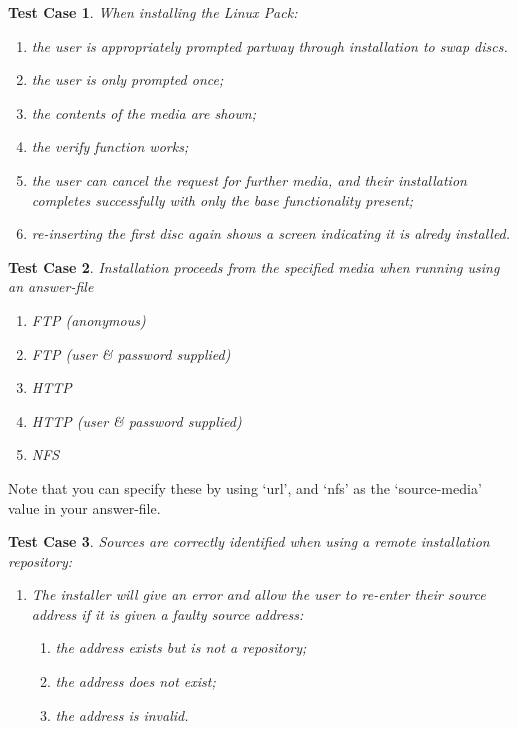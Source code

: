 \documentclass[a4paper]{article}
\newtheorem{testcase}{Test Case}
\begin{document}
\begin{testcase}
When installing the Linux Pack:
\begin{enumerate}
\item the user is appropriately prompted partway through installation
to swap discs.
\item the user is only prompted once;
\item the contents of the media are shown;
\item the verify function works;
\item the user can cancel the request for further media, and their
  installation completes successfully with only the base functionality
  present;
\item re-inserting the first disc again shows a screen indicating it
  is alredy installed.
\end{enumerate}
\end{testcase}

\begin{testcase}
Installation proceeds from the specified media when running using an
answer-file
\begin{enumerate}
\item FTP (anonymous)
\item FTP (user \& password supplied)
\item HTTP
\item HTTP (user \& password supplied)
\item NFS
\end{enumerate}
\end{testcase}
Note that you can specify these by using `url', and `nfs' as
the `source-media' value in your answer-file.

\begin{testcase}
Sources are correctly identified when using a remote installation
repository:
\begin{enumerate}
\item The installer will give an error and allow the user to re-enter
  their source address if it is given a faulty source address:
  \begin{enumerate}
  \item the address exists but is not a repository;
  \item the address does not exist;
  \item the address is invalid.
  \end{enumerate}
\end{enumerate}
\end{testcase}
\end{document}
